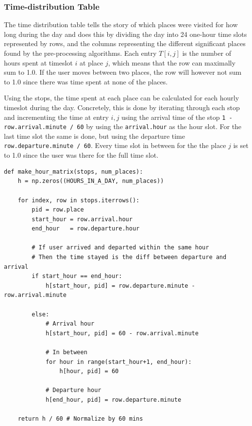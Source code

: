 \subsubsection{Time-distribution Table}
The time distribution table tells the story of which places were visited for how long during the day and does this by dividing the day into 24 one-hour time slots represented by rows, and the columns representing the different significant places found by the pre-processing algorithms. Each entry $T[i,j]$ is the number of hours spent at timeslot $i$ at place $j$, which means that the row can maximally sum to 1.0. If the user moves between two places, the row will however not sum to 1.0 since there was time spent at none of the places.

Using the stops, the time spent at each place can be calculated for each hourly timeslot during the day. Concretely, this is done by iterating through each stop and incrementing the time at entry $i,j$ using the arrival time of the stop \verb|1 - row.arrival.minute / 60| by using the \verb|arrival.hour| as the hour slot. For the last time slot the same is done, but using the departure time \verb|row.departure.minute / 60|. Every time slot in between for the the place $j$ is set to 1.0 since the user was there for the full time slot.

\begin{verbatim}
def make_hour_matrix(stops, num_places):
    h = np.zeros((HOURS_IN_A_DAY, num_places))
    
    for index, row in stops.iterrows():
        pid = row.place
        start_hour = row.arrival.hour
        end_hour   = row.departure.hour
        
        # If user arrived and departed within the same hour
        # Then the time stayed is the diff between departure and arrival
        if start_hour == end_hour:
            h[start_hour, pid] = row.departure.minute - row.arrival.minute
        
        else:
            # Arrival hour
            h[start_hour, pid] = 60 - row.arrival.minute

            # In between
            for hour in range(start_hour+1, end_hour):
                h[hour, pid] = 60

            # Departure hour
            h[end_hour, pid] = row.departure.minute
        
    return h / 60 # Normalize by 60 mins
\end{verbatim}



